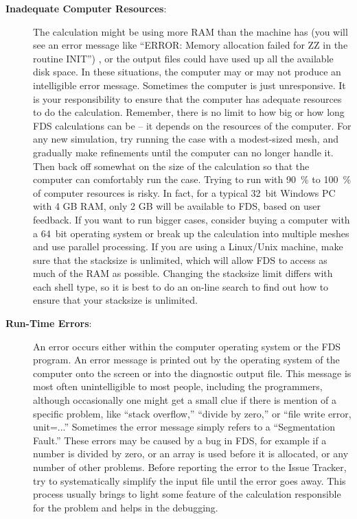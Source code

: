 \documentclass[11pt]{book}
\begin{document}
\begin{description}
\item[{\bf Inadequate Computer Resources}:]
The calculation might be using more RAM than the machine
has (you will see an error message like ``ERROR: Memory allocation failed for ZZ in the routine INIT'') , or the output files could have used up all the available disk space. In these situations, the
computer may or may not produce an intelligible error message. Sometimes the computer is just
unresponsive. It is your responsibility to ensure that the computer has adequate resources to
do the calculation. Remember, there is no limit to how big or how long FDS calculations can be -- it
depends on the resources of the computer. For any new simulation, try running the case with a modest-sized mesh,
and gradually make refinements until the computer can no longer handle it. Then back off
somewhat on the size of the calculation so that the computer can comfortably run the
case. Trying to run with 90~\% to 100~\% of computer resources is risky.
In fact, for a typical 32~bit Windows PC with 4 GB RAM, only 2 GB will be available to FDS, based on user feedback.
If you want to run bigger cases, consider buying a computer with a 64~bit operating system or break up the
calculation into multiple meshes and use parallel processing. If you are using a Linux/Unix machine, make sure that
the stacksize is unlimited, which will allow FDS to access as much of the RAM as possible. Changing the stacksize
limit differs with each shell type, so it is best to do an on-line search to find out how to ensure that your
stacksize is unlimited.

\item[{\bf Run-Time Errors}:]
An error occurs either within the computer operating system or the
FDS program. An error message is printed out by the operating system of
the computer onto the screen or into the diagnostic output file. This
message is most often unintelligible to most people, including the programmers,
although occasionally one might get a small clue if there is mention of a specific problem,
like ``stack overflow,'' ``divide by zero,'' or ``file write error, unit=...''
Sometimes the error message simply refers to a ``Segmentation Fault.''
These errors may be caused by a bug in FDS, for example if a number is divided by zero,
or an array is used before it is allocated, or any number of other problems.
Before reporting the error to the Issue Tracker, try to systematically simplify the
input file until the error goes away. This process usually brings to light some feature of the
calculation responsible for the problem and helps in the debugging.


\end{description}
\end{document}
